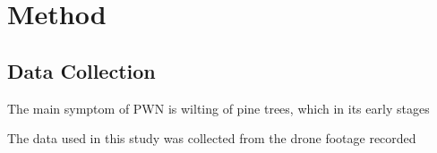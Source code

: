 \section{Method}

\subsection{Data Collection}

The main symptom of PWN is wilting of pine trees, which in its early stages 


The data used in this study was collected from the drone footage recorded 